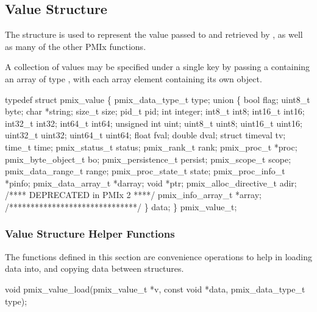 \subsection{Value Structure}

The  structure is used to represent the value passed to  and retrieved by , as well as many of the other \ac{PMIx} functions.

A collection of values may be specified under a single key by passing a  containing an array of type , with each array element containing its own object.

\cspecificstart
\begin{codepar}
typedef struct pmix_value \{
    pmix_data_type_t type;
    union \{
        bool flag;
        uint8_t byte;
        char *string;
        size_t size;
        pid_t pid;
        int integer;
        int8_t int8;
        int16_t int16;
        int32_t int32;
        int64_t int64;
        unsigned int uint;
        uint8_t uint8;
        uint16_t uint16;
        uint32_t uint32;
        uint64_t uint64;
        float fval;
        double dval;
        struct timeval tv;
        time_t time;
        pmix_status_t status;
        pmix_rank_t rank;
        pmix_proc_t *proc;
        pmix_byte_object_t bo;
        pmix_persistence_t persist;
        pmix_scope_t scope;
        pmix_data_range_t range;
        pmix_proc_state_t state;
        pmix_proc_info_t *pinfo;
        pmix_data_array_t *darray;
        void *ptr;
        pmix_alloc_directive_t adir;
        /**** DEPRECATED in PMIx 2 ****/
        pmix_info_array_t *array;
        /******************************/
    \} data;
\} pmix_value_t;
\end{codepar}
\cspecificend


\subsubsection{Value Structure Helper Functions}

The functions defined in this section are convenience operations to help in loading data into, and copying data between  structures.

\format

\cspecificstart
\begin{codepar}
void
pmix_value_load(pmix_value_t *v,
                const void *data, pmix_data_type_t type);
\end{codepar}
\cspecificend

